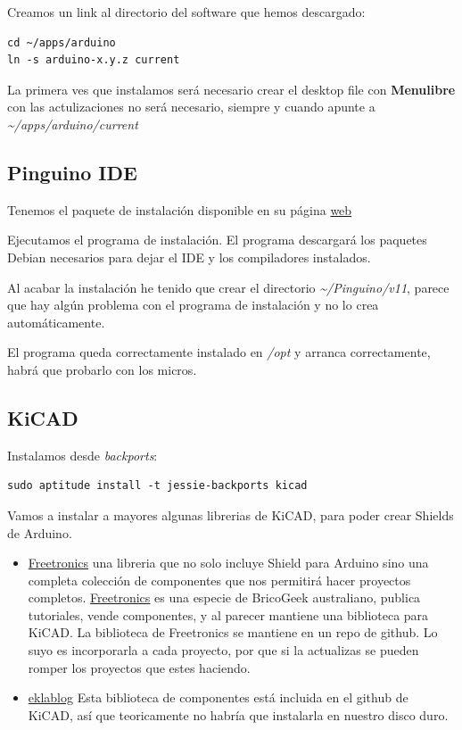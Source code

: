 \documentclass[12pt,spanish,]{article}
\providecommand{\tightlist}{%
  \setlength{\itemsep}{0pt}\setlength{\parskip}{0pt}}
\begin{document}
Creamos un link al directorio del software que hemos descargado:

\begin{verbatim}
cd ~/apps/arduino
ln -s arduino-x.y.z current
\end{verbatim}

La primera ves que instalamos será necesario crear el desktop file con
\textbf{Menulibre} con las actulizaciones no será necesario, siempre y
cuando apunte a \emph{\textasciitilde{}/apps/arduino/current}

\subsection{Pinguino IDE}\label{pinguino-ide}

Tenemos el paquete de instalación disponible en su página
\href{http://pinguino.cc/download.php}{web}

Ejecutamos el programa de instalación. El programa descargará los
paquetes Debian necesarios para dejar el IDE y los compiladores
instalados.

Al acabar la instalación he tenido que crear el directorio
\emph{\textasciitilde{}/Pinguino/v11}, parece que hay algún problema con
el programa de instalación y no lo crea automáticamente.

El programa queda correctamente instalado en \emph{/opt} y arranca
correctamente, habrá que probarlo con los micros.

\subsection{KiCAD}\label{kicad}

Instalamos desde \emph{backports}:

\begin{verbatim}
sudo aptitude install -t jessie-backports kicad
\end{verbatim}

Vamos a instalar a mayores algunas librerias de KiCAD, para poder crear
Shields de Arduino.

\begin{itemize}
\tightlist
\item
  \href{https://github.com/freetronics/freetronics_kicad_library}{Freetronics}
  una libreria que no solo incluye Shield para Arduino sino una completa
  colección de componentes que nos permitirá hacer proyectos completos.
  \href{http://www.freetronics.com}{Freetronics} es una especie de
  BricoGeek australiano, publica tutoriales, vende componentes, y al
  parecer mantiene una biblioteca para KiCAD. La biblioteca de
  Freetronics se mantiene en un repo de github. Lo suyo es incorporarla
  a cada proyecto, por que si la actualizas se pueden romper los
  proyectos que estes haciendo.
\item
  \href{http://meta-blog.eklablog.com/kicad-librairie-arduino-pretty-p930786}{eklablog}
  Esta biblioteca de componentes está incluida en el github de KiCAD,
  así que teoricamente no habría que instalarla en nuestro disco duro.
\end{itemize}
\end{document}
